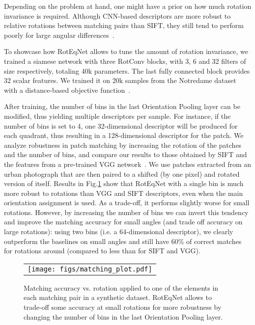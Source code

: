 \documentclass[10pt,twocolumn,letterpaper,table]{article}
\begin{document}
Depending on the problem at hand, one might have a prior on how much rotation invariance is required. Although CNN-based descriptors are more robust to relative rotations between matching pairs than SIFT, they still tend to perform poorly for large angular differences~\cite{simo2015discriminative}.

To showcase how RotEqNet allows to tune the amount of rotation invariance, we trained a siamese network with three RotConv blocks, with 3, 6 and 32 filters of size  respectively, totaling 40k parameters. The last fully connected block provides 32 scalar features. We trained it on 20k samples from the Notredame dataset~\cite{winder2007learning} with a distance-based objective function~\cite{simo2015discriminative,zagoruyko2015learning}.

After training, the number of bins in the last Orientation Pooling layer can be modified, thus yielding multiple descriptors per sample. For instance, if the number of bins is set to 4, one 32-dimensional descriptor will be produced for each quadrant, thus resulting in a 128-dimensional descriptor for the patch. We analyze robustness in patch matching by increasing the rotation of the patches and the number of bins, and compare our results to those obtained by SIFT and the features from a pre-trained VGG network~\cite{simo2015discriminative}. We use patches extracted from an urban photograph that are then paired to a shifted (by one pixel) and rotated version of itself. Results in Fig.\ref{fig:matching} show that RotEqNet with a single bin is much more robust to rotations than VGG and SIFT descriptors, even when the main orientation assignment is used. As a trade-off, it performs slightly worse for small rotations. However, by increasing the number of bins we can invert this tendency and improve the matching accuracy for small angles (and trade off accuracy on large rotations): using two bins (i.e. a 64-dimensional descriptor), we clearly outperform the baselines on small angles and still have 60\% of correct matches for rotations around  (compared to less than  for SIFT and VGG).

\begin{figure}[h]
\centering
\begin{tabular}{c}
\texttt{[image: figs/matching\_plot.pdf]} \\
\end{tabular}
\caption{Matching accuracy vs. rotation applied to one of the elements in each matching pair in a synthetic dataset. RotEqNet allows to trade-off some accuracy at small rotations for more robustness by changing the number of bins in the last Orientation Pooling layer.}
\label{fig:matching}
\vspace*{-2mm}
\end{figure}
\end{document}
